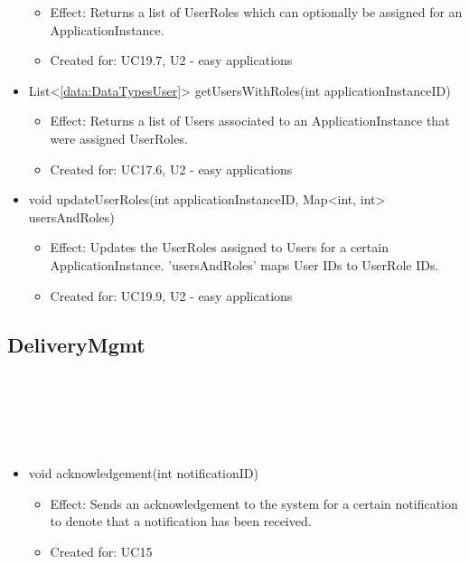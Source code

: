 \begin{description}
\begin{itemize}[noitemsep,nolistsep,leftmargin=-.25cm]
        \begin{itemize}[noitemsep,nolistsep]
           \item Effect: Returns a list of UserRoles which can optionally be assigned for an ApplicationInstance.
\item Created for: UC19.7, U2 - easy applications
        \end{itemize}
      \item \textsf{List\textless{}\ref{data:DataTypesUser}\textgreater{} getUsersWithRoles(int applicationInstanceID)}
        \begin{itemize}[noitemsep,nolistsep]
           \item Effect: Returns a list of Users associated to an ApplicationInstance that were assigned UserRoles.
\item Created for: UC17.6, U2 - easy applications
        \end{itemize}
      \item \textsf{void updateUserRoles(int applicationInstanceID, Map\textless{}int, int\textgreater{} usersAndRoles)}
        \begin{itemize}[noitemsep,nolistsep]
           \item Effect: Updates the UserRoles assigned to Users for a certain ApplicationInstance. 'usersAndRoles' maps User IDs to UserRole IDs.
\item Created for: UC19.9, U2 - easy applications
        \end{itemize}
    \end{itemize}
    \end{description}

  \subsection{DeliveryMgmt}\label{int:OnlineServiceOnlineServiceNotificationHandlerDeliveryMgmt}
    \begin{description}
      \item[Provided by:] \iconcomponent{}~
      \item[Required by:] \iconcomponent{}~
      \item[Operations:] ~
    \begin{itemize}[noitemsep,nolistsep,leftmargin=-.25cm]
      \item \textsf{void acknowledgement(int notificationID)}
        \begin{itemize}[noitemsep,nolistsep]
           \item Effect: Sends an acknowledgement to the system for a certain notification to denote that a notification has been received.
\item Created for: UC15
        \end{itemize}
    \end{itemize}
    \end{description}


